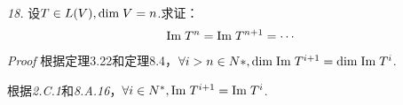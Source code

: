 \hspace*{\fill}

\textit{18.}
设\(T \in L(V),\mathrm{dim \;} V=n\).求证：
    \begin{align*}
        \mathrm{Im \;} T^n=\mathrm{Im \;} T^{n+1}=\cdots
    \end{align*}
\textit{Proof}
根据定理3.22和定理8.4，\(\forall i>n \in N*,\mathrm{dim \;} \mathrm{Im \;} T^{i+1}=\mathrm{dim \;} \mathrm{Im \;} T^i\).

根据\textit{2.C.1}和\textit{8.A.16}，\(\forall i \in N^*,\mathrm{Im \;} T^{i+1}=\mathrm{Im \;} T^i\).

